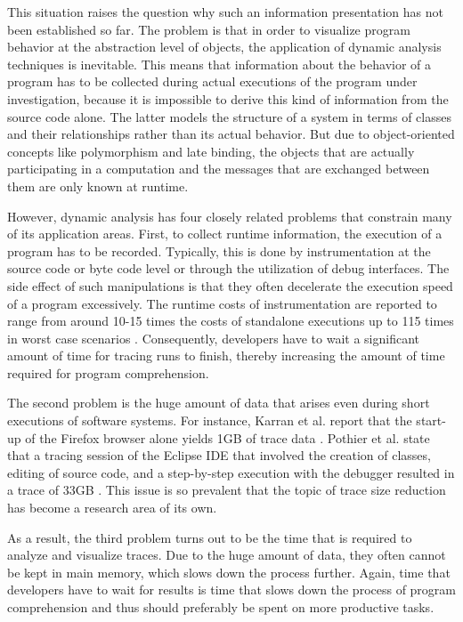 This situation raises the question why such an information presentation has not been established so far.
The problem is that in order to visualize program behavior at the abstraction level of objects, the application of dynamic analysis techniques is inevitable.
This means that information about the behavior of a program has to be collected during actual executions of the program under investigation, because it is impossible to derive this kind of information from the source code alone.
The latter models the structure of a system in terms of classes and their relationships rather than its actual behavior.
But due to object-oriented concepts like polymorphism and late binding, the objects that are actually participating in a computation and the messages that are exchanged between them are only known at runtime.

However, dynamic analysis has four closely related problems that constrain many of its application areas.
First, to collect runtime information, the execution of a program has to be recorded.
Typically, this is done by instrumentation at the source code or byte code level or through the utilization of debug interfaces.
The side effect of such manipulations is that they often decelerate the execution speed of a program excessively.
The runtime costs of instrumentation are reported to range from around 10-15 times the costs of standalone executions up to 115 times in worst case scenarios \cite{pothier_scalable_2007, karran_synctrace:_2013}.
Consequently, developers have to wait a significant amount of time for tracing runs to finish, thereby increasing the amount of time required for program comprehension.

The second problem is the huge amount of data that arises even during short executions of software systems.
For instance, Karran et al. report that the start-up of the Firefox browser alone yields 1GB of trace data \cite{karran_extraction_2013}.
Pothier et al. state that a tracing session of the Eclipse IDE that involved the creation of classes, editing of source code, and a step-by-step execution with the debugger resulted in a trace of 33GB \cite{pothier_scalable_2007}.
This issue is so prevalent that the topic of trace size reduction has become a research area of its own.

As a result, the third problem turns out to be the time that is required to analyze and visualize traces.
Due to the huge amount of data, they often cannot be kept in main memory, which slows down the process further.
Again, time that developers have to wait for results is time that slows down the process of program comprehension and thus should preferably be spent on more productive tasks.

